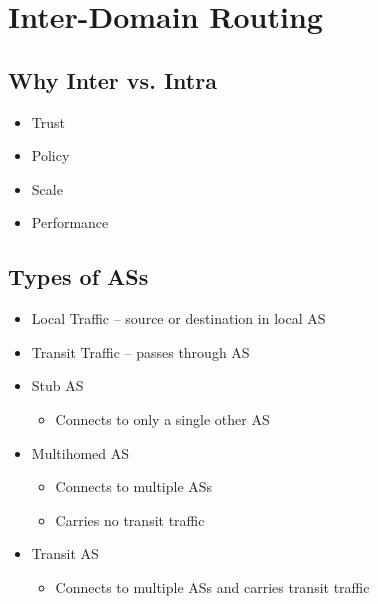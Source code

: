 \section{Inter-Domain Routing}
\subsection{Why Inter vs. Intra}
\begin{itemize}[nosep]
    \item Trust
    \item Policy
    \item Scale
    \item Performance
\end{itemize}
\subsection{Types of ASs}
\begin{itemize}[nosep]
    \item Local Traffic -- source or destination in local AS
    \item Transit Traffic -- passes through AS
    \item Stub AS
          \begin{itemize}[nosep]
              \item Connects to only a single other AS
          \end{itemize}
    \item Multihomed AS
          \begin{itemize}[nosep]
              \item Connects to multiple ASs
              \item Carries no transit traffic
          \end{itemize}
    \item Transit AS
          \begin{itemize}[nosep]
              \item Connects to multiple ASs and carries transit traffic
          \end{itemize}
\end{itemize}
